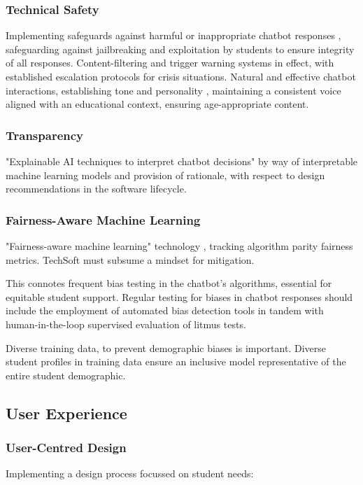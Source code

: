\documentclass[14pt,a4paper]{article}
\begin{document}
\begin{multicols}{2}
\subsubsection{Technical Safety}
Implementing safeguards against harmful or inappropriate chatbot responses \textit{\parencite[p. e11510]{Bickmore2021}}, safeguarding against jailbreaking and exploitation by students to ensure integrity of all responses. Content-filtering and trigger warning systems in effect, with established escalation protocols for crisis situations. Natural and effective chatbot interactions, establishing tone and personality \textit{\parencite[pp. 20-50]{Bradbury2024}}, maintaining a consistent voice aligned with an educational context, ensuring age-appropriate content.

\subsubsection{Transparency}
 "Explainable AI techniques to interpret chatbot decisions" \textit{\parencite[pp. 82-115]{Arrieta2022}} by way of interpretable machine learning models and provision of rationale, with respect to design recommendations in the software lifecycle.


 \subsubsection*{Fairness-Aware Machine Learning}
"Fairness-aware machine learning" technology \textit{\parencite{Barocas2021}}, tracking algorithm parity fairness metrics.
    TechSoft must subsume a mindset for mitigation.

This connotes frequent bias testing in the chatbot's algorithms, essential for equitable student support.
Regular testing for biases in chatbot responses \textit{\parencite{ACMFAccT2024}} should include the employment of automated bias detection tools in tandem with human-in-the-loop supervised evaluation of litmus tests.

Diverse training data, to prevent demographic biases \textit{\parencite[pp. 1-35]{Mehrabi2023}} is important. Diverse student profiles in training data ensure an inclusive model representative of the entire student demographic.

\subsection{User Experience}
\subsubsection{User-Centred Design}
Implementing a design process focussed on student needs:



\end{multicols}
\end{document}
